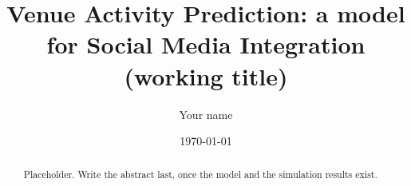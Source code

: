 \documentclass[11pt, a4paper]{article}
\title{Venue Activity Prediction: a model for Social Media Integration\\
\large (working title)}
\author{Your name}
\date{\today}
\begin{document}
\maketitle

\begin{abstract}
Placeholder. Write the abstract last, once the model and the simulation results exist.
\end{abstract}










\end{document}

